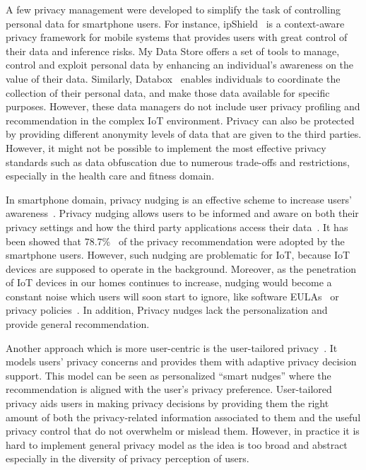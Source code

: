 A few privacy management were developed to simplify the task of controlling personal data for smartphone users. For instance, ipShield~\cite{chakraborty2014ipshield} is a context-aware privacy framework for mobile systems that provides users with great control of their data and inference risks. My Data Store \cite{ref:vescovi} offers a set of tools to manage, control and exploit personal data by enhancing an individual’s awareness on the value of their data. Similarly, Databox~\cite{ref:chaudhry} enables individuals to coordinate the collection of their personal data, and make those data available for specific purposes. However, these data managers do not include user privacy profiling and recommendation in the complex IoT environment. Privacy can also be protected by providing different anonymity levels of data that are given to the third parties. However, it might not be possible to implement the most effective privacy standards such as data obfuscation due to numerous trade-offs and restrictions, especially in the health care and fitness domain.

In smartphone domain, privacy nudging is an effective scheme to increase users' awareness~\cite{almuhimedi2015your}. Privacy nudging allows users to be informed and aware on both their privacy settings and how the third party applications access their data~\cite{liu2016follow,fu2014field}. It has been showed that 78.7\%~\cite{liu2016follow} of the privacy recommendation were adopted by the smartphone users. However, such nudging are problematic for IoT, because IoT devices are supposed to operate in the background. Moreover, as the penetration of IoT devices in our homes continues to increase, nudging would become a constant noise which users will soon start to ignore, like software EULAs~\cite{good2005spyware} or privacy policies~\cite{jensen2004privacy}. In addition, Privacy nudges lack the personalization and provide general recommendation.

Another approach which is more user-centric is the user-tailored privacy~\cite{knijnenburg2017privacy}. It models users’ privacy concerns and provides them with adaptive privacy decision support. This model can be seen as personalized ``smart nudges'' where the recommendation is aligned with the user's privacy preference. User-tailored privacy aids users in making privacy decisions by providing them the right amount of both the privacy-related information associated to them and the useful privacy control that do not overwhelm or mislead them. However, in practice it is hard to implement general privacy model as the idea is too broad and abstract especially in the diversity of privacy perception of users. 

